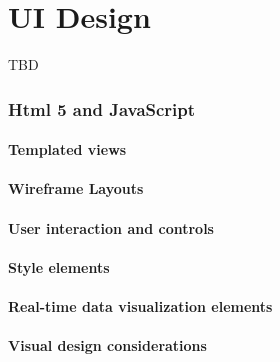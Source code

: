 \part{UI Design}
TBD
\section{Html 5 and JavaScript}

\subsection{Templated views}

\subsection{Wireframe Layouts}

\subsection{User interaction and controls}

\subsection{Style elements}

\subsection{Real-time data visualization elements}

\subsection{Visual design considerations}
